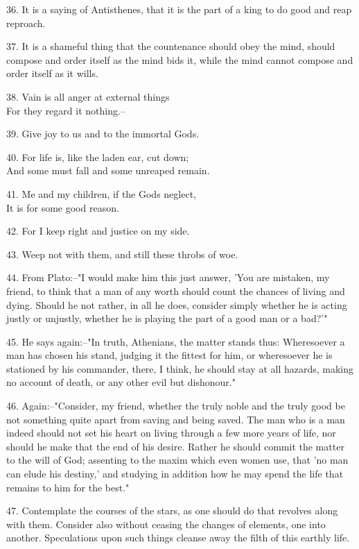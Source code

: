 \documentclass{book}
\begin{document}
36. It is a saying of Antisthenes, that it is the part of a king to do
good and reap reproach.

37. It is a shameful thing that the countenance should obey the mind,
should compose and order itself as the mind bids it, while the mind
cannot compose and order itself as it wills.

38. Vain is all anger at external things \\
    For they regard it nothing.--

39. Give joy to us and to the immortal Gods.

40. For life is, like the laden ear, cut down; \\
    And some must fall and some unreaped remain.

41. Me and my children, if the Gods neglect, \\
    It is for some good reason.

42. For I keep right and justice on my side.

43. Weep not with them, and still these throbs of woe.

44. From Plato:--"I would make him this just answer, 'You are
mistaken, my friend, to think that a man of any worth should count the
chances of living and dying. Should he not rather, in all he does,
consider simply whether he is acting justly or unjustly, whether he is
playing the part of a good man or a bad?'"

45. He says again:--"In truth, Athenians, the matter stands thus:
Wheresoever a man has chosen his stand, judging it the fittest for
him, or wheresoever he is stationed by his commander, there, I think,
he should stay at all hazards, making no account of death, or any
other evil but dishonour."

46. Again:--"Consider, my friend, whether the truly noble and the
truly good be not something quite apart from saving and being
saved. The man who is a man indeed should not set his heart on living
through a few more years of life, nor should he make that the end of
his desire. Rather he should commit the matter to the will of God;
assenting to the maxim which even women use, that 'no man can elude
his destiny,' and studying in addition how he may spend the life that
remains to him for the best."

47. Contemplate the courses of the stars, as one should do that
revolves along with them. Consider also without ceasing the changes of
elements, one into another. Speculations upon such things cleanse away
the filth of this earthly life.
\end{document}
